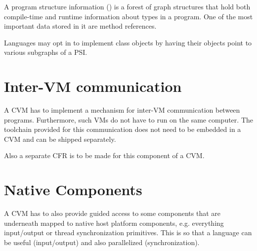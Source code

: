 A program structure information () is a forest of graph structures that hold both compile-time and runtime information about types in a program. One of the most important data stored in it are method references. 

Languages may opt in to implement class objects by having their objects point to various subgraphs of a PSI. 





\section{Inter-VM communication} %

A CVM has to implement a mechanism for inter-VM communication between programs. Furthermore, such VMs do not have to run on the same computer. The toolchain provided for this communication does not need to be embedded in a CVM and can be shipped separately. 

Also a separate CFR is to be made for this component of a CVM. 





\section{Native Components} %

A CVM has to also provide guided access to some components that are underneath mapped to native host platform components, e.g. everything input/output or thread synchronization primitives. This is so that a language can be useful (input/output) and also parallelized (synchronization). 





